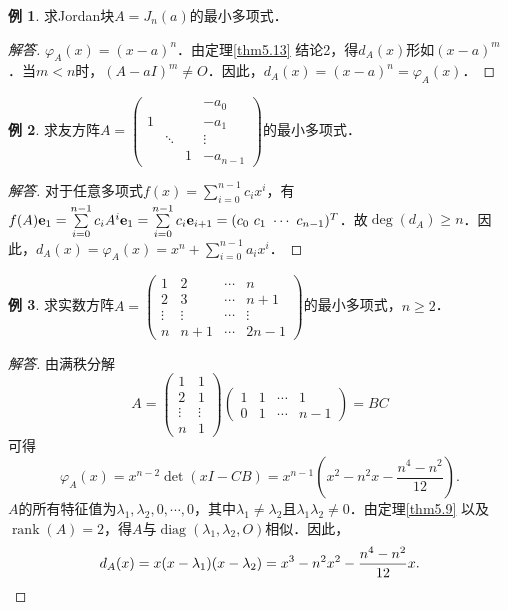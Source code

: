 \documentclass[a4paper,fontset=windows]{ctexbook}
\theoremstyle{definition}
\newtheorem{example}{例}[chapter]
\DeclareMathOperator{\diag}{diag}
\DeclareMathOperator{\rank}{rank}
\renewcommand{\ge}{\geqslant}
\begin{document}
\begin{example}\label{ex5.13}
求Jordan块$A=J_n(a)$的最小多项式．
\end{example}

\begin{proof}[解答]
$\varphi_A(x)=(x-a)^n$．由定理\ref{thm5.13} 结论2，得$d_A(x)$形如$(x-a)^m$．当$m<n$时，$(A-aI)^m\ne O$．因此，$d_A(x)=(x-a)^n=\varphi_A(x)$．
\end{proof}

\begin{example}\label{ex5.14}
求友方阵$A=\begin{pmatrix}&&&-a_0 \\ 1&&&-a_1 \\ &\ddots&&\vdots \\ &&1&-a_{n-1}\end{pmatrix}$的最小多项式．
\end{example}

\begin{proof}[解答]
对于任意多项式$f(x)=\sum\limits_{i=0}^{n-1}c_ix^i$，有$f(A){\bf e}_1=\sum\limits_{i=0}^{n-1}c_iA^i{\bf e}_1=\sum\limits_{i=0}^{n-1}c_i{\bf e}_{i+1}=(c_0~c_1~\cdots~c_{n-1})^T$．故$\deg(d_A)\ge n$．因此，$d_A(x)=\varphi_A(x)=x^n+\sum\limits_{i=0}^{n-1}a_ix^i$．
\end{proof}

\begin{example}
求实数方阵$A=\begin{pmatrix}1&2&\cdots&n \\ 2&3&\cdots&n+1 \\ \vdots&\vdots&\cdots&\vdots \\ n&n+1&\cdots&2n-1\end{pmatrix}$的最小多项式，$n\ge 2$．
\end{example}

\begin{proof}[解答]
由满秩分解
$$A=\begin{pmatrix}1&1 \\ 2&1 \\ \vdots&\vdots \\ n&1\end{pmatrix}\begin{pmatrix}1&1&\cdots&1 \\ 0&1&\cdots&n-1\end{pmatrix}=BC$$
可得
$$\varphi_A(x)=x^{n-2}\det(xI-CB)=x^{n-1}\left(x^2-n^2x-\frac{n^4-n^2}{12}\right).$$
$A$的所有特征值为$\lambda_1,\lambda_2,0,\cdots,0$，其中$\lambda_1\ne\lambda_2$且$\lambda_1\lambda_2\ne 0$．由定理\ref{thm5.9} 以及$\rank(A)=2$，得$A$与$\diag(\lambda_1,\lambda_2,O)$相似．因此，
\begin{equation*}
d_A(x)=x(x-\lambda_1)(x-\lambda_2)=x^3-n^2x^2-\frac{n^4-n^2}{12}x. \qedhere
\end{equation*}
\end{proof}
\end{document}
